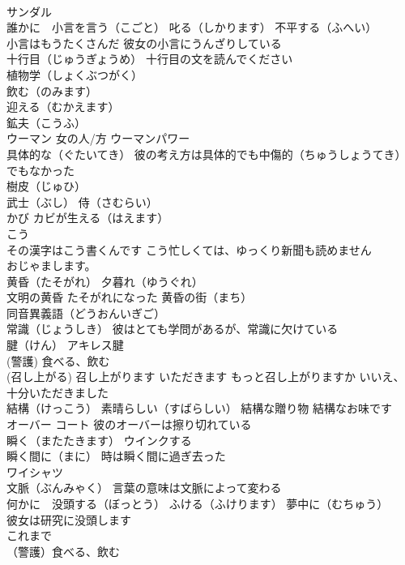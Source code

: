\documentclass[8pt]{extreport}
\begin{document}
\begin{CJK}{UTF8}{min}
\\	サンダル
\\	誰かに　小言を言う（こごと） 叱る（しかります） 不平する（ふへい）
\\	小言はもうたくさんだ 彼女の小言にうんざりしている
\\	十行目（じゅうぎょうめ） 十行目の文を読んでください
\\	植物学（しょくぶつがく）
\\	飲む（のみます）
\\	迎える（むかえます）
\\	鉱夫（こうふ）
\\	ウーマン 女の人/方 ウーマンパワー
\\	具体的な（ぐたいてき） 彼の考え方は具体的でも中傷的（ちゅうしょうてき）でもなかった
\\	樹皮（じゅひ）
\\	武士（ぶし） 侍（さむらい）
\\	かび カビが生える（はえます）
\\	こう　
\\	その漢字はこう書くんです こう忙しくては、ゆっくり新聞も読めません
\\	おじゃまします。
\\	黄昏（たそがれ） 夕暮れ（ゆうぐれ）
\\	文明の黄昏 たそがれになった 黄昏の街（まち）
\\	同音異義語（どうおんいぎご）
\\	常識（じょうしき） 彼はとても学問があるが、常識に欠けている
\\	腱（けん） アキレス腱
\\	(警護) 食べる、飲む 
\\	(召し上がる) 召し上がります いただきます もっと召し上がりますか いいえ、十分いただきました
\\	結構（けっこう） 素晴らしい（すばらしい） 結構な贈り物 結構なお味です
\\	オーバー コート 彼のオーバーは擦り切れている
\\	瞬く（またたきます） ウインクする
\\	瞬く間に（まに） 時は瞬く間に過ぎ去った
\\	ワイシャツ
\\	文脈（ぶんみゃく） 言葉の意味は文脈によって変わる
\\	何かに　没頭する（ぼっとう） ふける（ふけります） 夢中に（むちゅう）　
\\	彼女は研究に没頭します
\\	これまで
\\	（警護）食べる、飲む 

\end{CJK}
\end{document}
